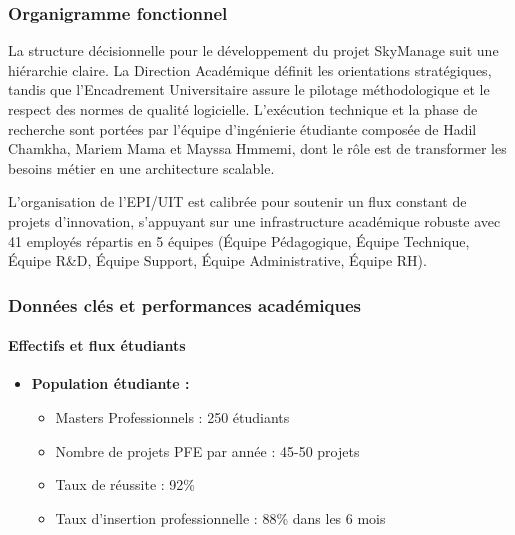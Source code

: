 \subsubsection{Organigramme fonctionnel}
La structure décisionnelle pour le développement du projet SkyManage suit une hiérarchie claire. La Direction Académique définit les orientations stratégiques, tandis que l'Encadrement Universitaire assure le pilotage méthodologique et le respect des normes de qualité logicielle. L'exécution technique et la phase de recherche sont portées par l'équipe d'ingénierie étudiante composée de Hadil Chamkha, Mariem Mama et Mayssa Hmmemi, dont le rôle est de transformer les besoins métier en une architecture scalable.

L'organisation de l'EPI/UIT est calibrée pour soutenir un flux constant de projets d'innovation, s'appuyant sur une infrastructure académique robuste avec 41 employés répartis en 5 équipes (Équipe Pédagogique, Équipe Technique, Équipe R\&D, Équipe Support, Équipe Administrative, Équipe RH).

\subsubsection{Données clés et performances académiques}

\paragraph{Effectifs et flux étudiants}
\begin{itemize}
    \item \textbf{Population étudiante :}
    \begin{itemize}
        \item Masters Professionnels : 250 étudiants
        \item Nombre de projets PFE par année : 45-50 projets
        \item Taux de réussite : 92\%
        \item Taux d'insertion professionnelle : 88\% dans les 6 mois
    \end{itemize}
\end{itemize}

